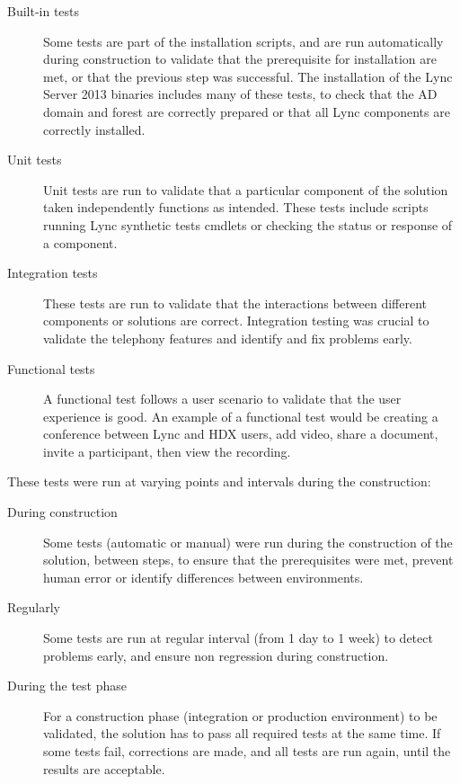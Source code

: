	\begin{description}
		\item[Built-in tests] Some tests are part of the installation scripts, and are run automatically during construction to validate that the prerequisite for installation are met, or that the previous step was successful. The installation of the Lync Server 2013 binaries includes many of these tests, to check that the AD domain and forest are correctly prepared or that all Lync components are correctly installed.
		
		\item[Unit tests] Unit tests are run to validate that a particular component of the solution taken independently functions as intended. These tests include scripts running Lync synthetic tests cmdlets or checking the status or response of a component.
		 
		\item[Integration tests] These tests are run to validate that the interactions between different components or solutions are correct. Integration testing was crucial to validate the telephony features and identify and fix problems early.
		
		\item[Functional tests] A functional test follows a user scenario to validate that the user experience is good. An example of a functional test would be creating a conference between Lync and HDX users, add video, share a document, invite a participant, then view the recording.
	\end{description}

	These tests were run at varying points and intervals during the construction:
	\begin{description}
		\item[During construction] Some tests (automatic or manual) were run during the construction of the solution, between steps, to ensure that the prerequisites were met, prevent human error or identify differences between environments.
		
		\item[Regularly] Some tests are run at regular interval (from 1 day to 1 week) to detect problems early, and ensure non regression during construction.
		
		\item[During the test phase] For a construction phase (integration or production environment) to be validated, the solution has to pass all required tests at the same time. If some tests fail, corrections are made, and all tests are run again, until the results are acceptable.
	\end{description}

